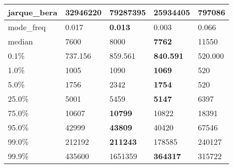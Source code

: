 \begin{table}[H]
\begin{tabular}{|l|m{10em}|m{10em}|m{10em}|m{10em}|}
\hline jarque\_bera & 32946220 & \cellcolor[rgb]{0.9, 0.54, 0.52} 79287395 & \bfseries 25934405 & 797086 \\
\hline mode\_freq & 0.017 & \bfseries 0.013 & 0.003 & \cellcolor[rgb]{0.9, 0.54, 0.52} 0.066 \\
\hline median & 7600 & 8000 & \bfseries 7762 & \cellcolor[rgb]{0.9, 0.54, 0.52} 11550 \\
\hline 0.1\% & 737.156 & 859.561 & \bfseries 840.591 & \cellcolor[rgb]{0.9, 0.54, 0.52} 520.000 \\
\hline 1.0\% & 1005 & 1090 & \bfseries 1069 & \cellcolor[rgb]{0.9, 0.54, 0.52} 520 \\
\hline 5.0\% & 1756 & 2342 & \bfseries 1754 & \cellcolor[rgb]{0.9, 0.54, 0.52} 520 \\
\hline 25.0\% & 5001 & 5459 & \bfseries 5147 & \cellcolor[rgb]{0.9, 0.54, 0.52} 6397 \\
\hline 75.0\% & 10607 & \bfseries 10799 & 10822 & \cellcolor[rgb]{0.9, 0.54, 0.52} 18391 \\
\hline 95.0\% & 42999 & \bfseries 43809 & 40420 & \cellcolor[rgb]{0.9, 0.54, 0.52} 67546 \\
\hline 99.0\% & 212192 & \bfseries 211243 & \cellcolor[rgb]{0.9, 0.54, 0.52} 178585 & 240127 \\
\hline 99.9\% & 435600 & \cellcolor[rgb]{0.9, 0.54, 0.52} 1651359 & \bfseries 364317 & 315722 \\
\hline
\end{tabular}
\end{table}
